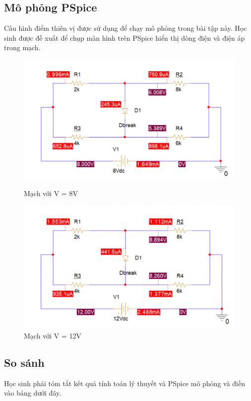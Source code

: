 \subsection{Mô phỏng PSpice}
Cấu hình điểm thiên vị được sử dụng để chạy mô phỏng trong bài tập này. Học sinh được đề xuất
để chụp màn hình trên PSpice hiển thị dòng điện và điện áp trong mạch.
\begin{figure}[h]
    \centering
    \includegraphics[scale=0.27]{graphics/ex3/f2.png}
    \caption{Mạch với V = 8V}
    \includegraphics[scale=0.27]{graphics/ex3/f4.png}
    \caption{Mạch với V = 12V}
\end{figure}
\pagebreak
\subsection{So sánh}
Học sinh phải tóm tắt kết quả tính toán lý thuyết và PSpice
mô phỏng và điền vào bảng dưới đây.

